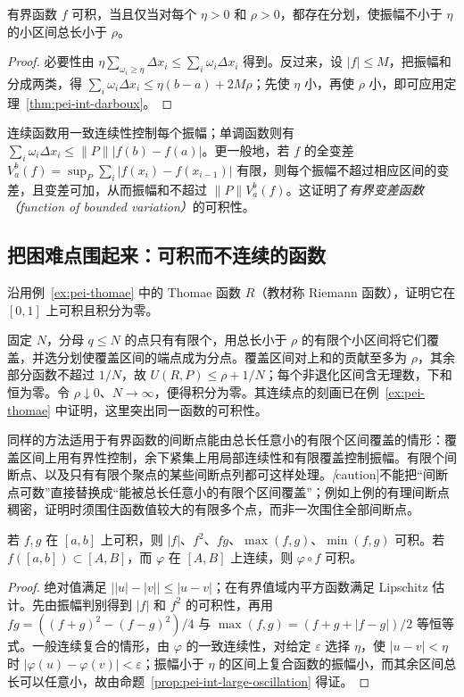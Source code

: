 \begin{proposition}
\label{prop:pei-int-large-oscillation}
有界函数 $f$ 可积，当且仅当对每个 $\eta>0$ 和 $\rho>0$，都存在分划，使振幅不小于 $\eta$ 的小区间总长小于 $\rho$。
\end{proposition}
\begin{proof}
必要性由 $\eta\sum_{\omega_i\ge\eta}\Delta x_i\le\sum_i\omega_i\Delta x_i$ 得到。反过来，设 $|f|\le M$，把振幅和分成两类，得 $\sum_i\omega_i\Delta x_i\le\eta(b-a)+2M\rho$；先使 $\eta$ 小，再使 $\rho$ 小，即可应用定理~\ref{thm:pei-int-darboux}。
\end{proof}
连续函数用一致连续性控制每个振幅；单调函数则有 $\sum_i\omega_i\Delta x_i\le\lVert P\rVert|f(b)-f(a)|$。更一般地，若 $f$ 的全变差 $V_a^b(f)=\sup_P\sum_i|f(x_i)-f(x_{i-1})|$ 有限，则每个振幅不超过相应区间的变差，且变差可加，从而振幅和不超过 $\lVert P\rVert V_a^b(f)$。这证明了\emph{有界变差函数（function of bounded variation）}的可积性。

\subsection{把困难点围起来：可积而不连续的函数}
\begin{example}
\label{ex:pei-int-thomae}
沿用例~\ref{ex:pei-thomae} 中的 Thomae 函数 $R$（教材称 Riemann 函数），证明它在 $[0,1]$ 上可积且积分为零。
\end{example}
\begin{solve}
固定 $N$，分母 $q\le N$ 的点只有有限个，用总长小于 $\rho$ 的有限个小区间将它们覆盖，并选分划使覆盖区间的端点成为分点。覆盖区间对上和的贡献至多为 $\rho$，其余部分函数不超过 $1/N$，故 $U(R,P)\le\rho+1/N$；每个非退化区间含无理数，下和恒为零。令 $\rho\downarrow0$、$N\to\infty$，便得积分为零。其连续点的刻画已在例~\ref{ex:pei-thomae} 中证明，这里突出同一函数的可积性。
\end{solve}
同样的方法适用于有界函数的间断点能由总长任意小的有限个区间覆盖的情形：覆盖区间上用有界性控制，余下紧集上用局部连续性和有限覆盖控制振幅。有限个间断点、以及只有有限个聚点的某些间断点列都可这样处理。\emph[caution]{不能把“间断点可数”直接替换成“能被总长任意小的有限个区间覆盖”}；例如上例的有理间断点稠密，证明时须围住函数值较大的有限多个点，而非一次围住全部间断点。

\begin{proposition}
\label{prop:pei-int-composition}
若 $f,g$ 在 $[a,b]$ 上可积，则 $|f|$、$f^2$、$fg$、$\max(f,g)$、$\min(f,g)$ 可积。若 $f([a,b])\subset[A,B]$，而 $\varphi$ 在 $[A,B]$ 上连续，则 $\varphi\circ f$ 可积。
\end{proposition}
\begin{proof}
绝对值满足 $\bigl||u|-|v|\bigr|\le|u-v|$；在有界值域内平方函数满足 Lipschitz 估计。先由振幅判别得到 $|f|$ 和 $f^2$ 的可积性，再用 $fg=((f+g)^2-(f-g)^2)/4$ 与 $\max(f,g)=(f+g+|f-g|)/2$ 等恒等式。一般连续复合的情形，由 $\varphi$ 的一致连续性，对给定 $\varepsilon$ 选择 $\eta$，使 $|u-v|<\eta$ 时 $|\varphi(u)-\varphi(v)|<\varepsilon$；振幅小于 $\eta$ 的区间上复合函数的振幅小，而其余区间总长可以任意小，故由命题~\ref{prop:pei-int-large-oscillation} 得证。
\end{proof}

